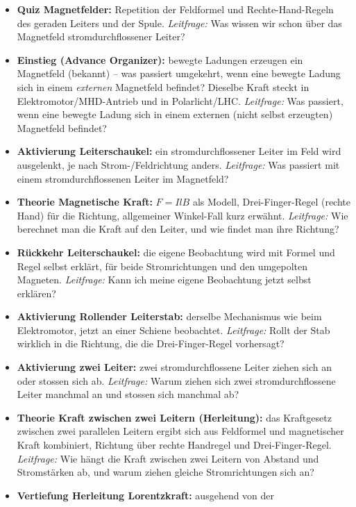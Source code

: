 \documentclass[11pt,a4paper]{article}
\begin{document}
\begin{itemize}[leftmargin=1.3cm,itemsep=0.3em]
  \item \textbf{Quiz Magnetfelder:} Repetition der Feldformel und
  Rechte-Hand-Regeln des geraden Leiters und der Spule. \emph{Leitfrage:}
  Was wissen wir schon über das Magnetfeld stromdurchflossener Leiter?
  \item \textbf{Einstieg (Advance Organizer):} bewegte Ladungen erzeugen
  ein Magnetfeld (bekannt) -- was passiert umgekehrt, wenn eine bewegte
  Ladung sich in einem \emph{externen} Magnetfeld befindet? Dieselbe Kraft
  steckt in Elektromotor/MHD-Antrieb und in Polarlicht/LHC.
  \emph{Leitfrage:} Was passiert, wenn eine bewegte Ladung sich in einem
  externen (nicht selbst erzeugten) Magnetfeld befindet?
  \item \textbf{Aktivierung Leiterschaukel:} ein stromdurchflossener
  Leiter im Feld wird ausgelenkt, je nach Strom-/Feldrichtung anders.
  \emph{Leitfrage:} Was passiert mit einem stromdurchflossenen Leiter im
  Magnetfeld?
  \item \textbf{Theorie Magnetische Kraft:} $F=IlB$ als Modell,
  Drei-Finger-Regel (rechte Hand) für die Richtung, allgemeiner
  Winkel-Fall kurz erwähnt. \emph{Leitfrage:} Wie berechnet man die Kraft
  auf den Leiter, und wie findet man ihre Richtung?
  \item \textbf{Rückkehr Leiterschaukel:} die eigene Beobachtung wird mit
  Formel und Regel selbst erklärt, für beide Stromrichtungen und den
  umgepolten Magneten. \emph{Leitfrage:} Kann ich meine eigene Beobachtung
  jetzt selbst erklären?
  \item \textbf{Aktivierung Rollender Leiterstab:} derselbe Mechanismus
  wie beim Elektromotor, jetzt an einer Schiene beobachtet.
  \emph{Leitfrage:} Rollt der Stab wirklich in die Richtung, die die
  Drei-Finger-Regel vorhersagt?
  \item \textbf{Aktivierung zwei Leiter:} zwei stromdurchflossene Leiter
  ziehen sich an oder stossen sich ab. \emph{Leitfrage:} Warum ziehen sich
  zwei stromdurchflossene Leiter manchmal an und stossen sich manchmal ab?
  \item \textbf{Theorie Kraft zwischen zwei Leitern (Herleitung):} das
  Kraftgesetz zwischen zwei parallelen Leitern ergibt sich aus Feldformel
  und magnetischer Kraft kombiniert, Richtung über rechte Handregel und
  Drei-Finger-Regel. \emph{Leitfrage:} Wie hängt die Kraft zwischen zwei
  Leitern von Abstand und Stromstärken ab, und warum ziehen gleiche
  Stromrichtungen sich an?
  \item \textbf{Vertiefung Herleitung Lorentzkraft:} ausgehend von der

\end{itemize}
\end{document}

